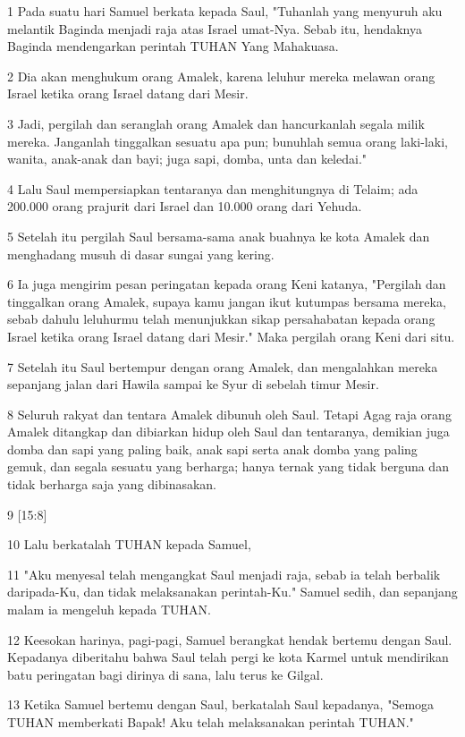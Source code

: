 \par 1 Pada suatu hari Samuel berkata kepada Saul, "Tuhanlah yang menyuruh aku melantik Baginda menjadi raja atas Israel umat-Nya. Sebab itu, hendaknya Baginda mendengarkan perintah TUHAN Yang Mahakuasa.
\par 2 Dia akan menghukum orang Amalek, karena leluhur mereka melawan orang Israel ketika orang Israel datang dari Mesir.
\par 3 Jadi, pergilah dan seranglah orang Amalek dan hancurkanlah segala milik mereka. Janganlah tinggalkan sesuatu apa pun; bunuhlah semua orang laki-laki, wanita, anak-anak dan bayi; juga sapi, domba, unta dan keledai."
\par 4 Lalu Saul mempersiapkan tentaranya dan menghitungnya di Telaim; ada 200.000 orang prajurit dari Israel dan 10.000 orang dari Yehuda.
\par 5 Setelah itu pergilah Saul bersama-sama anak buahnya ke kota Amalek dan menghadang musuh di dasar sungai yang kering.
\par 6 Ia juga mengirim pesan peringatan kepada orang Keni katanya, "Pergilah dan tinggalkan orang Amalek, supaya kamu jangan ikut kutumpas bersama mereka, sebab dahulu leluhurmu telah menunjukkan sikap persahabatan kepada orang Israel ketika orang Israel datang dari Mesir." Maka pergilah orang Keni dari situ.
\par 7 Setelah itu Saul bertempur dengan orang Amalek, dan mengalahkan mereka sepanjang jalan dari Hawila sampai ke Syur di sebelah timur Mesir.
\par 8 Seluruh rakyat dan tentara Amalek dibunuh oleh Saul. Tetapi Agag raja orang Amalek ditangkap dan dibiarkan hidup oleh Saul dan tentaranya, demikian juga domba dan sapi yang paling baik, anak sapi serta anak domba yang paling gemuk, dan segala sesuatu yang berharga; hanya ternak yang tidak berguna dan tidak berharga saja yang dibinasakan.
\par 9 [15:8]
\par 10 Lalu berkatalah TUHAN kepada Samuel,
\par 11 "Aku menyesal telah mengangkat Saul menjadi raja, sebab ia telah berbalik daripada-Ku, dan tidak melaksanakan perintah-Ku." Samuel sedih, dan sepanjang malam ia mengeluh kepada TUHAN.
\par 12 Keesokan harinya, pagi-pagi, Samuel berangkat hendak bertemu dengan Saul. Kepadanya diberitahu bahwa Saul telah pergi ke kota Karmel untuk mendirikan batu peringatan bagi dirinya di sana, lalu terus ke Gilgal.
\par 13 Ketika Samuel bertemu dengan Saul, berkatalah Saul kepadanya, "Semoga TUHAN memberkati Bapak! Aku telah melaksanakan perintah TUHAN."
